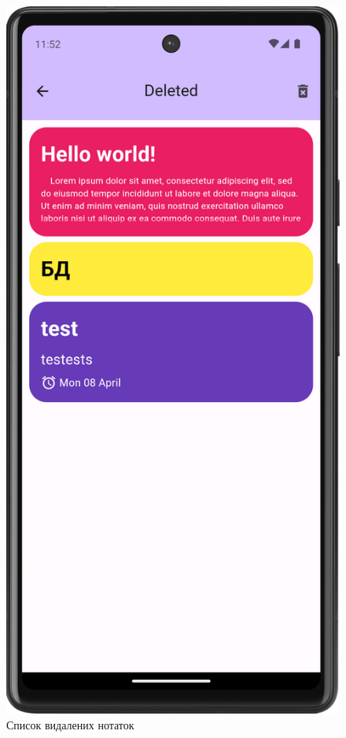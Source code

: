 \documentclass[oneside,14pt]{extarticle}
\begin{document}
\begin{normalsize}
\begin{figure}[H]
\begin{minipage}{0.48\textwidth}
		\end{minipage}\hfill
		\begin{minipage}{0.48\textwidth}
			\centering
			\includegraphics[scale=0.12]{6}
			\caption{Список видалених нотаток}
		\end{minipage}
	\end{figure}
	

\end{normalsize}
\end{document}
